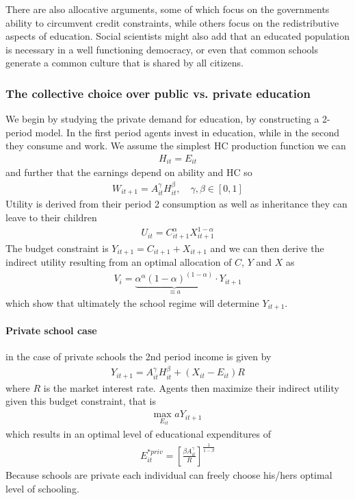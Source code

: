 \documentclass[12pt, a4paper]{article}
\begin{document}
\begin{multicols}{2}
There are also allocative arguments, some of which focus on the governments ability to circumvent credit constraints, while others focus on the redistributive aspects of education. Social scientists might also add that an educated population is necessary in a well functioning democracy, or even that common schools generate a common culture that is shared by all citizens. 

\subsubsection{The collective choice over public vs. private education}
We begin by studying the private demand for education, by constructing a 2-period model. In the first period agents invest in education, while in the second they consume and work. We assume the simplest HC production function we can
\begin{align*}
H_{it} = E_{it}
\end{align*}
and further that the earnings depend on ability and HC so
\begin{align*}
W_{it+1} = A_{it}^{\gamma}H_{it}^{\beta}, \quad \gamma, \beta \in [0,1]
\end{align*}
Utility is derived from their period 2 consumption as well as inheritance they can leave to their children
\begin{align*}
U_{it} = C_{it+1}^{\alpha}X_{it+1}^{1-\alpha}
\end{align*}
The budget constraint is $Y_{it+1}=C_{it+1}+X_{it+1}$ and we can then derive the indirect utility resulting from an optimal allocation of $C$, $Y$ and $X$ as 
\begin{align*}
V_i = \underbrace{\alpha^{\alpha}(1-\alpha)^{(1-\alpha)} }_{\equiv a} \cdot Y_{it+1}
\end{align*}
which show that ultimately the school regime will determine $Y_{it+1}$. 

\paragraph{Private school case} in the case of private schools the 2nd period income is given by 
\begin{align*}
Y_{it+1} = A_{it}^{\gamma}H_{it}^{\beta} + (X_{it} - E_{it})R
\end{align*}
where $R$ is the market interest rate. Agents then maximize their indirect utility given this budget constraint, that is 
\begin{align*}
\underset{E_{it}}{\text{max }} a Y_{it+1}
\end{align*}
which results in an optimal level of educational expenditures of 
\begin{align*}
E_{it}^{*priv} = \left[ \frac{\beta A_{it}^{\gamma}}{R} \right]^{\frac{1}{1-\beta}}
\end{align*}
Because schools are private each individual can freely choose his/hers optimal level of schooling. 


\end{multicols}
\end{document}
